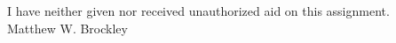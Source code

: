 \documentclass[12pt, letterpaper]{article}
\author{Matt Brockley}
\title{}
\begin{document}
	
	
	
	\begin{center}
		I have neither given nor received unauthorized aid on this assignment.\\
		Matthew W. Brockley	
	\end{center}
\end{document}
